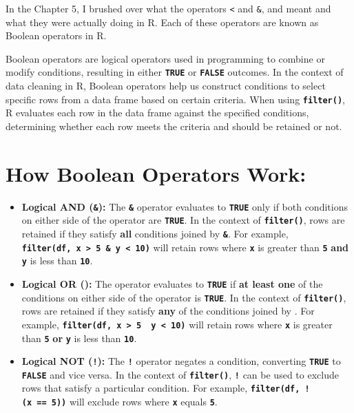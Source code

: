 \documentclass[
]{book}
\begin{document}
In the Chapter 5, I brushed over what the operators \texttt{\textless{}} and \texttt{\&}, and \texttt{\textbar{}} meant and what they were actually doing in R. Each of these operators are known as Boolean operators in R.

Boolean operators are logical operators used in programming to combine or modify conditions, resulting in either \textbf{\texttt{TRUE}} or \textbf{\texttt{FALSE}} outcomes. In the context of data cleaning in R, Boolean operators help us construct conditions to select specific rows from a data frame based on certain criteria. When using \textbf{\texttt{filter()}}, R evaluates each row in the data frame against the specified conditions, determining whether each row meets the criteria and should be retained or not.

\hypertarget{how-boolean-operators-work}{%
\section{How Boolean Operators Work:}\label{how-boolean-operators-work}}

\begin{itemize}
\item
  \textbf{Logical AND (\texttt{\&}):} The \textbf{\texttt{\&}} operator evaluates to \textbf{\texttt{TRUE}} only if both conditions on either side of the operator are \textbf{\texttt{TRUE}}. In the context of \textbf{\texttt{filter()}}, rows are retained if they satisfy \textbf{all} conditions joined by \textbf{\texttt{\&}}. For example, \textbf{\texttt{filter(df,\ x\ \textgreater{}\ 5\ \&\ y\ \textless{}\ 10)}} will retain rows where \textbf{\texttt{x}} is greater than \textbf{\texttt{5}} \textbf{and} \textbf{\texttt{y}} is less than \textbf{\texttt{10}}.
\item
  \textbf{Logical OR (\texttt{\textbar{}}):} The \textbf{\texttt{\textbar{}}} operator evaluates to \textbf{\texttt{TRUE}} if \textbf{at least one} of the conditions on either side of the operator is \textbf{\texttt{TRUE}}. In the context of \textbf{\texttt{filter()}}, rows are retained if they satisfy \textbf{any} of the conditions joined by \textbf{\texttt{\textbar{}}}. For example, \textbf{\texttt{filter(df,\ x\ \textgreater{}\ 5\ \textbar{}\ y\ \textless{}\ 10)}} will retain rows where \textbf{\texttt{x}} is greater than \textbf{\texttt{5}} \textbf{or} \textbf{\texttt{y}} is less than \textbf{\texttt{10}}.
\item
  \textbf{Logical NOT (\texttt{!}):} The \textbf{\texttt{!}} operator negates a condition, converting \textbf{\texttt{TRUE}} to \textbf{\texttt{FALSE}} and vice versa. In the context of \textbf{\texttt{filter()}}, \textbf{\texttt{!}} can be used to exclude rows that satisfy a particular condition. For example, \textbf{\texttt{filter(df,\ !(x\ ==\ 5))}} will exclude rows where \textbf{\texttt{x}} equals \textbf{\texttt{5}}.
\end{itemize}
\end{document}
